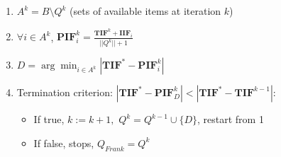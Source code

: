 \documentclass[12pt, a4paper, titilepage]{article}
\begin{document}
\begin{enumerate}
	\item  $A^k = B \setminus Q^k$ (sets of available items at iteration $k$)
	\item $\forall i \in A^k$, $\mathbf{PIF}_{i}^k = \frac{\mathbf{TIF}^k + \mathbf{IIF}_{i}}{||Q^k||+1}$
	\item $D = \arg \min_{i \in A^k} |\mathbf{TIF}^* - \mathbf{PIF}_i^k|$
	\item Termination criterion: $|\mathbf{TIF}^* - \mathbf{PIF}_D^{k}| < |\mathbf{TIF}^* - \mathbf{TIF}^{k-1}|$: 
	\begin{itemize}
		\item  If true, $k := k + 1,$ $Q^{k} = Q^{k-1} \cup \{D\}$, restart from 1 
		
		\item  If false, stops, $Q_{Frank} = Q^k$
		
	\end{itemize}
\end{enumerate}
\end{document}
